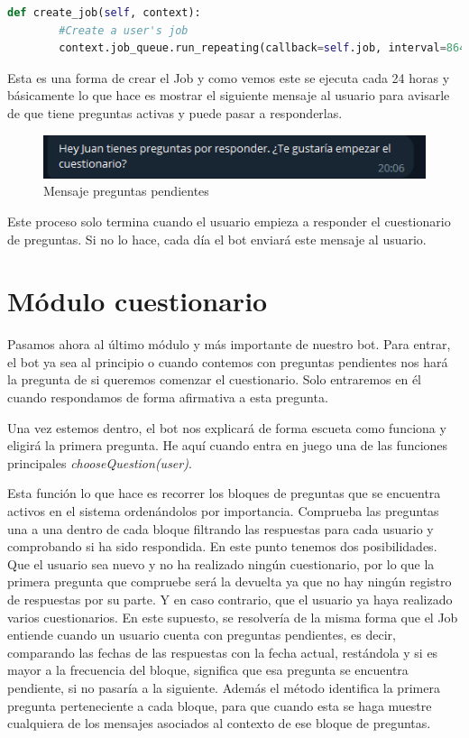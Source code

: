 \begin{lstlisting}[language=Python]
    def create_job(self, context):
        #Create a user's job
        context.job_queue.run_repeating(callback=self.job, interval=86400, first=0, context=self.suscriber.chatid, name=self.suscriber.chatid)
\end{lstlisting}

Esta es una forma de crear el Job y como vemos este se ejecuta cada 24 horas y básicamente lo que hace es mostrar el siguiente mensaje al usuario para avisarle de que tiene preguntas activas y puede pasar a responderlas.

\begin{figure}[!ht]
    \centering
    \includegraphics[width=1\textwidth]{imagenes/mensaje_preguntasactivas.png}
    \caption{ Mensaje preguntas pendientes }
    \label{fig:enter-label}
\end{figure}\vspace{0.3cm}

Este proceso solo termina cuando el usuario empieza a responder el cuestionario de preguntas. Si no lo hace, cada día el bot enviará este mensaje al usuario. 

\section{Módulo cuestionario}

Pasamos ahora al último módulo y más importante de nuestro bot. Para entrar, el bot ya sea al principio o cuando contemos con preguntas pendientes nos hará la pregunta de si queremos comenzar el cuestionario. Solo entraremos en él cuando respondamos de forma afirmativa a esta pregunta. 

Una vez estemos dentro, el bot nos explicará de forma escueta como funciona y eligirá la primera pregunta. He aquí cuando entra en juego una de las funciones principales \textit{chooseQuestion(user)}.

Esta función lo que hace es recorrer los bloques de preguntas que se encuentra activos en el sistema ordenándolos por importancia. Comprueba las preguntas una a una dentro de cada bloque filtrando las respuestas para cada usuario y comprobando si ha sido respondida. En este punto tenemos dos posibilidades. Que el usuario sea nuevo y no ha realizado ningún cuestionario, por lo que la primera pregunta que compruebe será la devuelta ya que no hay ningún registro de respuestas por su parte. Y en caso contrario, que el usuario ya haya realizado varios cuestionarios. En este supuesto, se resolvería de la misma forma que el Job entiende cuando un usuario cuenta con preguntas pendientes, es decir, comparando las fechas de las respuestas con la fecha actual, restándola y si es mayor a la frecuencia del bloque, significa que esa pregunta se encuentra pendiente, si no pasaría a la siguiente. Además el método identifica la primera pregunta perteneciente a cada bloque, para que cuando esta se haga muestre cualquiera de los mensajes asociados al contexto de ese bloque de preguntas.

